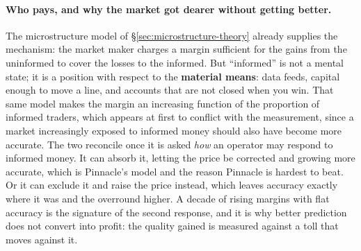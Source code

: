 \documentclass[12pt,a4paper,oneside]{report}
\renewcommand{\_}{\oldunderscore\allowbreak}
\theoremstyle{definition}
\theoremstyle{plain}
\theoremstyle{definition}   %
\begin{document}
\paragraph{Who pays, and why the market got dearer without getting better.} The microstructure
model of \S\ref{sec:microstructure-theory} already supplies the mechanism: the market maker
charges a margin sufficient for the gains from the uninformed to cover the losses to the
informed. But ``informed'' is not a mental state; it is a position with respect to the
\textbf{material means}: data feeds, capital enough to move a line, and accounts that are not
closed when you win. That same model makes the margin an increasing function of the proportion of
informed traders, which appears at first to conflict with the measurement, since a market
increasingly exposed to informed money should also have become more accurate. The two reconcile
once it is asked \emph{how} an operator may respond to informed money. It can absorb it, letting
the price be corrected and growing more accurate, which is Pinnacle's model and the reason
Pinnacle is hardest to beat. Or it can exclude it and raise the price instead, which leaves
accuracy exactly where it was and the overround higher. A decade of rising margins with flat
accuracy is the signature of the second response, and it is why better prediction does not
convert into profit: the quality gained is measured against a toll that moves against it.
\end{document}
